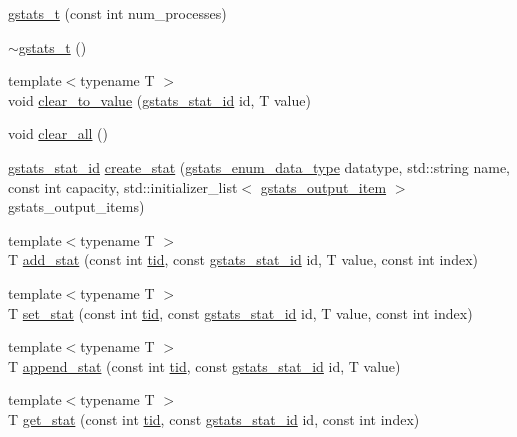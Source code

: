 \begin{DoxyCompactItemize}
\item 
\hyperlink{classgstats__t_a8799bbb87ebba7af97007a7774092518}{gstats\+\_\+t} (const int num\+\_\+processes)
\item 
\hyperlink{classgstats__t_a0638a31844fd63d17ba55d54d34e55af}{$\sim$gstats\+\_\+t} ()
\item 
{\footnotesize template$<$typename T $>$ }\\void \hyperlink{classgstats__t_a16f67bb2adcdeccd94669fcbfa86b9ff}{clear\+\_\+to\+\_\+value} (\hyperlink{gstats_8h_a662beb90f6d56f5ee9df4d812d39aa33}{gstats\+\_\+stat\+\_\+id} id, T value)
\item 
void \hyperlink{classgstats__t_a5f7327cd91575e8e07c913113e544021}{clear\+\_\+all} ()
\item 
\hyperlink{gstats_8h_a662beb90f6d56f5ee9df4d812d39aa33}{gstats\+\_\+stat\+\_\+id} \hyperlink{classgstats__t_a6f6442c5e217300004d009330f655d81}{create\+\_\+stat} (\hyperlink{gstats_8h_add042cd26594ae31bc443952e37d30f6}{gstats\+\_\+enum\+\_\+data\+\_\+type} datatype, std\+::string name, const int capacity, std\+::initializer\+\_\+list$<$ \hyperlink{classgstats__output__item}{gstats\+\_\+output\+\_\+item} $>$ gstats\+\_\+output\+\_\+items)
\item 
{\footnotesize template$<$typename T $>$ }\\T \hyperlink{classgstats__t_a2b601cbf9e9e71bd35ccf033c7cf2d47}{add\+\_\+stat} (const int \hyperlink{microbench_2main_8cpp_a9ca9869868fe7e7a38a921cc7de4103f}{tid}, const \hyperlink{gstats_8h_a662beb90f6d56f5ee9df4d812d39aa33}{gstats\+\_\+stat\+\_\+id} id, T value, const int index)
\item 
{\footnotesize template$<$typename T $>$ }\\T \hyperlink{classgstats__t_a39a2efb2cd4e874559dfd430dff841ae}{set\+\_\+stat} (const int \hyperlink{microbench_2main_8cpp_a9ca9869868fe7e7a38a921cc7de4103f}{tid}, const \hyperlink{gstats_8h_a662beb90f6d56f5ee9df4d812d39aa33}{gstats\+\_\+stat\+\_\+id} id, T value, const int index)
\item 
{\footnotesize template$<$typename T $>$ }\\T \hyperlink{classgstats__t_a448015c63c37f2d98f7026f2eb1454a1}{append\+\_\+stat} (const int \hyperlink{microbench_2main_8cpp_a9ca9869868fe7e7a38a921cc7de4103f}{tid}, const \hyperlink{gstats_8h_a662beb90f6d56f5ee9df4d812d39aa33}{gstats\+\_\+stat\+\_\+id} id, T value)
\item 
{\footnotesize template$<$typename T $>$ }\\T \hyperlink{classgstats__t_aa5de3ae993697b4520ed7916d3ee3373}{get\+\_\+stat} (const int \hyperlink{microbench_2main_8cpp_a9ca9869868fe7e7a38a921cc7de4103f}{tid}, const \hyperlink{gstats_8h_a662beb90f6d56f5ee9df4d812d39aa33}{gstats\+\_\+stat\+\_\+id} id, const int index)

\end{DoxyCompactItemize}
